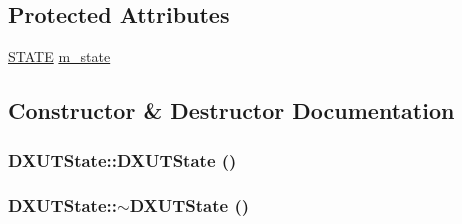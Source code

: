 \subsection*{Protected Attributes}
\begin{DoxyCompactItemize}
\item 
\hyperlink{struct_d_x_u_t_state_1_1_s_t_a_t_e}{STATE} \hyperlink{class_d_x_u_t_state_ac77bc02614deabbbbfde3190f2f0b9fe}{m\_\-state}
\end{DoxyCompactItemize}


\subsection{Constructor \& Destructor Documentation}
\hypertarget{class_d_x_u_t_state_a6c4887fc291daad529bd9ad62323c600}{
\subsubsection[{DXUTState}]{\setlength{\rightskip}{0pt plus 5cm}DXUTState::DXUTState ()}}
\label{class_d_x_u_t_state_a6c4887fc291daad529bd9ad62323c600}
\hypertarget{class_d_x_u_t_state_a342d44fc12982a24def12dcd2c611f85}{
\subsubsection[{$\sim$DXUTState}]{\setlength{\rightskip}{0pt plus 5cm}DXUTState::$\sim$DXUTState ()}}
\label{class_d_x_u_t_state_a342d44fc12982a24def12dcd2c611f85}


